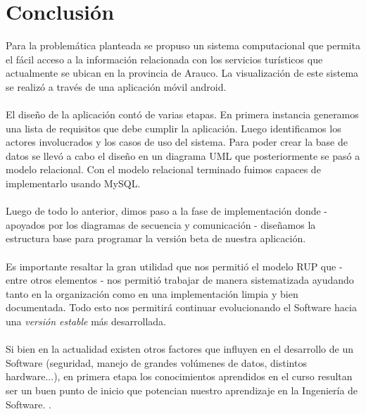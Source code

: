 \documentclass[12pt]{article}
\begin{document}
\section{Conclusión}
Para la problemática planteada se propuso un sistema computacional que permita el fácil acceso a la información relacionada con los servicios turísticos que actualmente se ubican en la provincia de Arauco. La visualización de este sistema se realizó a través de una aplicación móvil android.\\\\
El diseño de la aplicación contó de varias etapas. En primera instancia generamos una lista de requisitos que debe cumplir la aplicación. Luego identificamos los actores involucrados y los casos de uso del sistema. Para poder crear la base de datos se llevó a cabo el diseño en un diagrama UML que posteriormente se pasó a modelo relacional. Con el modelo relacional terminado fuimos capaces de implementarlo usando MySQL.\\\\Luego de todo lo anterior, dimos paso a la fase de implementación donde - apoyados por los diagramas de secuencia y comunicación - diseñamos la estructura base para programar la versión beta de nuestra aplicación.\\\\Es importante resaltar la gran utilidad que nos permitió el modelo RUP que - entre otros elementos - nos permitió trabajar de manera sistematizada ayudando tanto en la organización como en una implementación limpia y bien documentada. Todo esto nos permitirá continuar evolucionando el Software hacia una \emph{versión estable} más desarrollada.\\\\Si bien en la actualidad existen otros factores que influyen en el desarrollo de un Software (seguridad, manejo de grandes volúmenes de datos, distintos hardware...), en primera etapa los conocimientos aprendidos en el curso resultan ser un buen punto de inicio que potencian nuestro aprendizaje en la Ingeniería de Software. 
.
\newpage
\end{document}
